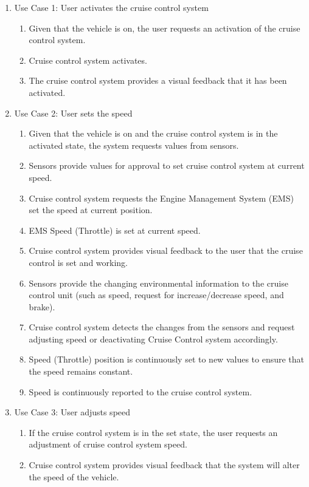 \documentclass[preprint,11pt,3p]{article}
\begin{document}
\begin{enumerate}
	\item Use Case 1: User activates the cruise control system
		\begin{enumerate}
			\item Given that the vehicle is on, the user requests an activation of the cruise control system.
			\item Cruise control system activates.
			\item The cruise control system provides a visual feedback that it has been activated.
		\end{enumerate}
	\item Use Case 2: User sets the speed
		\begin{enumerate}
			\item Given that the vehicle is on and the cruise control system is in the activated state, the system requests values from sensors.
			\item Sensors provide values for approval to set cruise control system at current speed.
			\item Cruise control system requests the Engine Management System (EMS) set the speed at current position.
			\item EMS Speed (Throttle) is set at current speed.
			\item Cruise control system provides visual feedback to the user that the cruise control is set and working.
			\item Sensors provide the changing environmental information to the cruise control unit (such as speed, request for increase/decrease speed, and brake).
			\item Cruise control system detects the changes from the sensors and request adjusting speed or deactivating Cruise Control system accordingly.
			\item Speed (Throttle) position is continuously set to new values to ensure that the speed remains constant.
			\item Speed is continuously reported to the cruise control system.
		\end{enumerate}
	\item Use Case 3: User adjusts speed
		\begin{enumerate}
			\item If the cruise control system is in the set state, the user requests an adjustment of cruise control system speed.
			\item Cruise control system provides visual feedback that the system will alter the speed of the vehicle.

\end{enumerate}
\end{enumerate}
\end{document}

